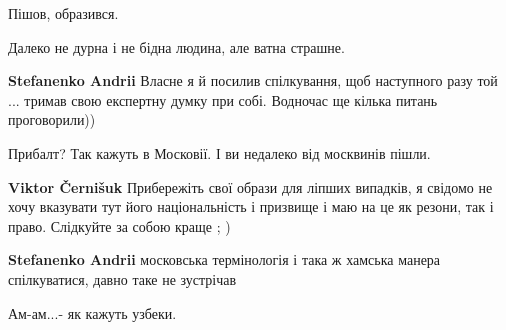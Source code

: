 \begin{itemize}
Пішов, образився.

Далеко не дурна і не бідна людина, але ватна страшне.

\begin{itemize}
 
\textbf{Stefanenko Andrii}
Власне я й посилив спілкування, щоб наступного разу той ... тримав свою експертну думку при собі.
Водночас ще кілька питань проговорили))

 
Прибалт? Так кажуть в Московії. І ви недалеко від москвинів пішли.

 
\textbf{Viktor Černišuk} Прибережіть свої образи для ліпших випадків, я свідомо не хочу вказувати тут його національність і призвище і маю на це як резони, так і право. Слідкуйте за собою краще ; )

 
\textbf{Stefanenko Andrii} московська термінологія і така ж хамська манера спілкуватися, давно таке не зустрічав
\end{itemize}

 
Ам-ам...- як кажуть узбеки.

\begin{itemize}
 

\end{itemize}
\end{itemize}
